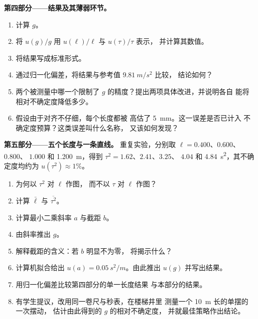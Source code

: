 \begin{problem}
\medskip
\noindent\textbf{第四部分——结果及其薄弱环节。}
\begin{enumerate}[resume]
  \item 计算 $g$。
  \item 将 $u(g)/g$ 用 $u(\ell)/\ell$ 与 $u(\tau)/\tau$ 表示，
        并计算其数值。
  \item 将结果写成标准形式。
  \item 通过归一化偏差，将结果与参考值 $\qty{9.81}{m/s^2}$ 比较，
        结论如何？
  \item 两个被测量中哪一个限制了
        $g$ 的精度？提出两项具体改进，并说明各自
        能将相对不确定度降低多少。
  \item 假设由于对齐不仔细，每个长度都被
        高估了 \qty{5}{mm}。这一误差是否已计入
        不确定度预算？这类误差叫什么名称，
        又该如何发现？
\end{enumerate}

\medskip
\noindent\textbf{第五部分——五个长度与一条直线。}
重复实验，分别取 $\ell = 0.400$、$0.600$、$0.800$、
$1.000$ 和 \qty{1.200}{m}，得到 $\tau^2 = 1.62$、$2.41$、$3.25$、
$4.04$ 和 \qty{4.84}{s^2}，其不确定度均约为 $u(\tau^2) \approx 1\%$。
\begin{enumerate}[resume]
  \item 为何以 $\tau^2$ 对 $\ell$ 作图，
        而不以 $\tau$ 对 $\ell$ 作图？
  \item 计算 $\bar\ell$ 与 $\overline{\tau^2}$。
  \item 计算最小二乘斜率 $a$ 与截距 $b$。
  \item 由斜率推出 $g$。
  \item 解释截距的含义：若 $b$ 明显不为零，
        将揭示什么？
  \item 计算机拟合给出 $u(a) = \qty{0.05}{s^2/m}$。由此推出
        $u(g)$ 并写出结果。
  \item 用归一化偏差比较第四部分的单一长度结果
        与本部分的结果。
  \item 有学生提议，改用同一卷尺与秒表，在楼梯井里
        测量一个 \qty{10}{m} 长的单摆的一次摆动，
        估计由此得到的 $g$ 的相对不确定度，
        并就最佳策略作出结论。
\end{enumerate}
\end{problem}
